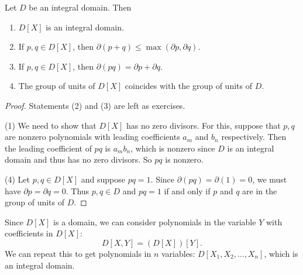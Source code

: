 \begin{theorem}
  Let $D$ be an integral domain. Then
  \begin{enumerate}
    \item $D[X]$ is an integral domain.
    \item If $p, q \in D[X]$, then
      $\partial (p + q) \le \max(\partial p, \partial q)$.
    \item If $p, q \in D[X]$, then
      $\partial (p q) = \partial p + \partial q$.
    \item The group of units of $D[X]$ coincides
      with the group of units of $D$.
  \end{enumerate}
\end{theorem}

\begin{proof}
  Statements (2) and (3) are left as exercises.

  (1) We need to show that $D[X]$ has no zero divisors.
  For this, suppose that $p, q$ are nonzero polynomials
  with leading coefficients $a_m$ and $b_n$ respectively.
  Then the leading coefficient of $pq$ is $a_m b_n$,
  which is nonzero since $D$ is an integral domain and
  thus has no zero divisors. So $pq$ is nonzero.

  (4) Let $p, q \in D[X]$ and suppose $pq = 1$.
  Since $\partial (pq) = \partial (1) = 0$, we must
  have $\partial p = \partial q = 0$. Thus $p, q \in D$
  and $pq = 1$ if and only if $p$ and $q$ are in
  the group of units of $D$.
\end{proof}

Since $D[X]$ is a domain, we can consider polynomials
in the variable $Y$ with coefficients in $D[X]$:
\[D[X, Y] = (D[X])[Y].\]
We can repeat this to get polynomials in $n$
variables: $D[X_1, X_2, \dots, X_n]$, which is
an integral domain.
